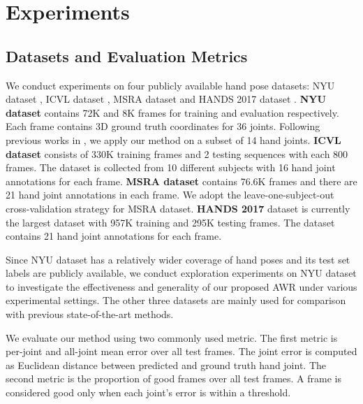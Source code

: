 \documentclass[letterpaper]{article} \usepackage{aaai20}  \usepackage{times}  \usepackage{helvet} \usepackage{courier}  \usepackage[hyphens]{url}  \usepackage{graphicx} \usepackage{amsmath}
\begin{document}
\section{Experiments}

\subsection{Datasets and Evaluation Metrics}

We conduct experiments on four publicly available hand pose datasets: NYU dataset \cite{nyu}, ICVL dataset \cite{icvl}, MSRA dataset \cite{offset2} and HANDS 2017 dataset \cite{hands17}. \textbf{NYU dataset} contains 72K and 8K frames for training and evaluation respectively. Each frame contains 3D ground truth coordinates for 36 joints. Following previous works in \cite{p2p}, we apply our method on a subset of 14 hand joints. \textbf{ICVL dataset} consists of 330K training frames and 2 testing sequences with each 800 frames. The dataset is collected from 10 different subjects with 16 hand joint annotations for each frame. \textbf{MSRA dataset} contains 76.6K frames and there are 21 hand joint annotations in each frame. We adopt the leave-one-subject-out cross-validation strategy for MSRA dataset. \textbf{HANDS 2017} dataset is currently the largest dataset with 957K training and 295K testing frames. The dataset contains 21 hand joint annotations for each frame.

\parskip=0pt

Since NYU dataset has a relatively wider coverage of hand poses and its test set labels are publicly available, we conduct exploration experiments on NYU dataset to investigate the effectiveness and generality of our proposed AWR under various experimental settings. The other three datasets are mainly used for comparison with previous state-of-the-art methods. 

\parskip=0pt

We evaluate our method using two commonly used metric. The first metric is per-joint and all-joint mean error over all test frames. The joint error is computed as Euclidean distance between predicted and ground truth hand joint. The second metric is the proportion of good frames over all test frames. A frame is considered good only when each joint's error is within a threshold. 
\end{document}
